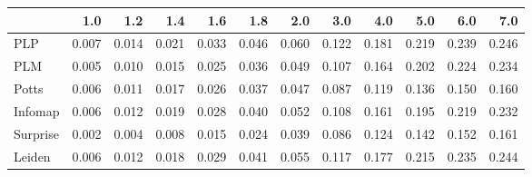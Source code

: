 \begin{tabular}{lrrrrrrrrrrr}
\toprule
{} &   1.0 &   1.2 &   1.4 &   1.6 &   1.8 &   2.0 &   3.0 &   4.0 &   5.0 &   6.0 &   7.0 \\
\midrule
PLP      & 0.007 & 0.014 & 0.021 & 0.033 & 0.046 & 0.060 & 0.122 & 0.181 & 0.219 & 0.239 & 0.246 \\
PLM      & 0.005 & 0.010 & 0.015 & 0.025 & 0.036 & 0.049 & 0.107 & 0.164 & 0.202 & 0.224 & 0.234 \\
Potts    & 0.006 & 0.011 & 0.017 & 0.026 & 0.037 & 0.047 & 0.087 & 0.119 & 0.136 & 0.150 & 0.160 \\
Infomap  & 0.006 & 0.012 & 0.019 & 0.028 & 0.040 & 0.052 & 0.108 & 0.161 & 0.195 & 0.219 & 0.232 \\
Surprise & 0.002 & 0.004 & 0.008 & 0.015 & 0.024 & 0.039 & 0.086 & 0.124 & 0.142 & 0.152 & 0.161 \\
Leiden   & 0.006 & 0.012 & 0.018 & 0.029 & 0.041 & 0.055 & 0.117 & 0.177 & 0.215 & 0.235 & 0.244 \\
\bottomrule
\end{tabular}
